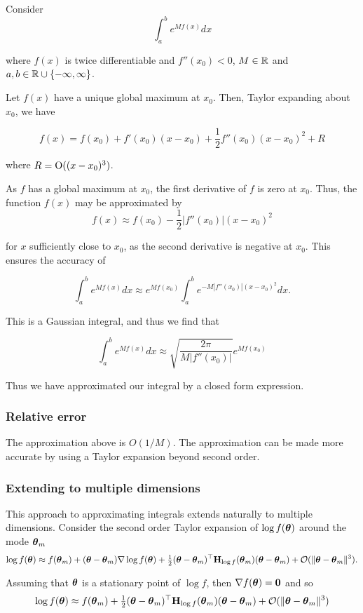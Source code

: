 \documentclass{amsart}[12pt]
\begin{document}
Consider
\[
	\int_a^b e^{M f(x)} dx
\]

where $f(x)$ is twice differentiable and $f''(x_0) < 0$, $M \in {\mathbb{R}}$ and $a, b \in {\mathbb{R}} \cup \{-\infty, \infty\}$.

Let $f(x)$ have a unique global maximum at $x_0$. Then, Taylor expanding about $x_0$, we have

\[
	f(x) = f(x_0) + f'(x_0) (x - x_0) + \frac{1}{2} f''(x_0) (x - x_0)^2 + R
\]

where $R = \text{O}((x - x_0)^3)$.

As $f$ has a global maximum at $x_0$, the first derivative of $f$ is zero at $x_0$. Thus, the function $f(x)$
may be approximated by
\[
	f(x) \approx f(x_0) - \frac{1}{2} |f''(x_0)| (x - x_0)^2
\]

for $x$ sufficiently close to $x_0$, as the second derivative is negative at $x_0$. This ensures the
accuracy of

\[
	\int_a^b e^{M f(x)} dx \approx e^{M f(x_0)} \int_a^b e^{-M |f''(x_0)|(x - x_0)^2} dx.
\]

This is a Gaussian integral, and thus we find that

\[
	\int_a^b e^{M f(x)} dx \approx \sqrt{\frac{2 \pi}{M |f''(x_0)|}} e^{M f(x_0)}
\]

Thus we have approximated our integral by a closed form expression.

\subsubsection{Relative error} %
The approximation above is $O(1/M)$. %
The approximation can be made more accurate by using a Taylor
expansion beyond second order.

\subsubsection{Extending to multiple dimensions}
This approach to approximating integrals extends naturally to multiple dimensions.
Consider the second order Taylor expansion of $\log f({\boldsymbol \theta})$ around the mode ${\boldsymbol \theta}_m$
$$
\log f({\boldsymbol \theta}) \approx f({\boldsymbol \theta}_m) + ({\boldsymbol \theta} - {\boldsymbol \theta}_m) \nabla \log f({\boldsymbol \theta}) + \tfrac{1}{2} ({\boldsymbol \theta} - {\boldsymbol \theta}_m)^\top {\bf H}_{\log f}({\boldsymbol \theta}_m) ({\boldsymbol \theta} - {\boldsymbol \theta}_m) + {\mathcal O}(\|{\boldsymbol \theta} - {\boldsymbol \theta}_m\|^3).
$$

Assuming that ${\boldsymbol \theta}$ is a stationary point of $\log f$, then $\nabla f({\boldsymbol \theta}) = {\bf 0}$ and so
$$
\log f({\boldsymbol \theta}) \approx f({\boldsymbol \theta}_m) + \tfrac{1}{2} ({\boldsymbol \theta} - {\boldsymbol \theta}_m)^\top {\bf H}_{\log f}({\boldsymbol \theta}_m) ({\boldsymbol \theta} - {\boldsymbol \theta}_m) + {\mathcal O}(\|{\boldsymbol \theta} - {\boldsymbol \theta}_m\|^3)
$$
\end{document}
